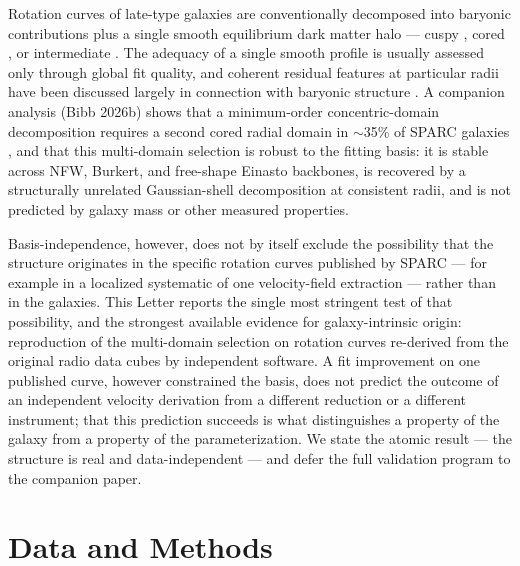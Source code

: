 \documentclass[twocolumn]{aastex701}
\begin{document}
Rotation curves of late-type galaxies are conventionally decomposed into
baryonic contributions plus a single smooth equilibrium dark matter halo ---
cuspy \citep[NFW;][]{Navarro1996}, cored \citep[Burkert;][]{Burkert1995}, or
intermediate \citep[Einasto;][]{Einasto1965}. The adequacy of a single smooth
profile is usually assessed only through global fit quality, and coherent
residual features at particular radii have been discussed largely in connection
with baryonic structure \citep[``Renzo's rule'';][]{Sancisi2004}. A companion
analysis (Bibb 2026b) shows that a minimum-order concentric-domain decomposition
requires a second cored radial domain in $\sim$35\% of SPARC galaxies
\citep{Lelli2016}, and that this multi-domain selection is robust to the fitting
basis: it is stable across NFW, Burkert, and free-shape Einasto backbones, is
recovered by a structurally unrelated Gaussian-shell decomposition at consistent
radii, and is not predicted by galaxy mass or other measured properties.

Basis-independence, however, does not by itself exclude the possibility that the
structure originates in the specific rotation curves published by SPARC --- for
example in a localized systematic of one velocity-field extraction --- rather
than in the galaxies. This Letter reports the single most stringent test of that
possibility, and the strongest available evidence for galaxy-intrinsic origin:
reproduction of the multi-domain selection on rotation curves re-derived from the
original radio data cubes by independent software. A fit improvement on one
published curve, however constrained the basis, does not predict the outcome of
an independent velocity derivation from a different reduction or a different
instrument; that this prediction succeeds is what distinguishes a property of the
galaxy from a property of the parameterization. We state the atomic result --- the
structure is real and data-independent --- and defer the full validation program
to the companion paper.

\section{Data and Methods} \label{sec:methods}
\end{document}
